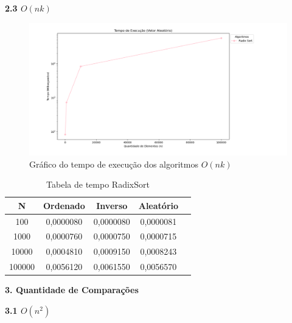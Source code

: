 \documentclass[10pt]{article}
\begin{document}
\vspace{0.5cm}

\textbf{2.3 $O(n k)$}

\begin{figure}[H]
  \centering
  \includegraphics[width=1.1\textwidth]{TempoExecnk.png}
  \caption{Gráfico do tempo de execução dos algoritmos $O(n k)$}
  \label{fig:3}
\end{figure}

\begin{table}[H]
  \centering
  \caption{Tabela de tempo RadixSort}
  \begin{tabular}{|c|c|c|c|c|}
  \hline
  N & Ordenado & Inverso & Aleatório \\ \hline
  100 & 0,0000080 & 0,0000080 & 0,0000081 \\ \hline
  1000 & 0,0000760 & 0,0000750 & 0,0000715 \\ \hline
  10000 & 0,0004810 & 0,0009150 & 0,0008243 \\ \hline
  100000 & 0,0056120 & 0,0061550 & 0,0056570 \\ \hline
  \end{tabular}
\end{table}

\vspace{0.25cm}

\textbf{3. Quantidade de Comparações}

\vspace{0.5cm}

\textbf{3.1 $O(n^2)$}
\end{document}
